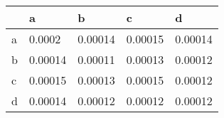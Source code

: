 \begin{tabular}{lllll}
\toprule
{} &        a &        b &        c &        d \\
\midrule
a &   0.0002 &  0.00014 &  0.00015 &  0.00014 \\
b &  0.00014 &  0.00011 &  0.00013 &  0.00012 \\
c &  0.00015 &  0.00013 &  0.00015 &  0.00012 \\
d &  0.00014 &  0.00012 &  0.00012 &  0.00012 \\
\bottomrule
\end{tabular}
